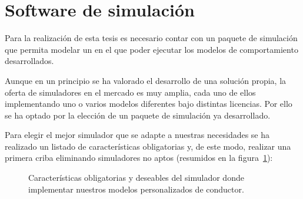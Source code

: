 \section{Software de simulación}

Para la realización de esta tesis es necesario contar con un paquete de simulación que permita modelar un  en el que poder ejecutar los modelos de comportamiento desarrollados.

Aunque en un principio se ha valorado el desarrollo de una solución propia, la oferta de simuladores en el mercado es muy amplia, cada uno de ellos implementando uno o varios modelos diferentes bajo distintas licencias. Por ello se ha optado por la elección de un paquete de simulación ya desarrollado.


Para elegir el mejor simulador que se adapte a nuestras necesidades se ha realizado un listado de características obligatorias y, de este modo, realizar una primera criba eliminando simuladores no aptos (resumidos en la figura~\ref{fig:simulator-features}):

\begin{figure}[t]
	\centering
	\caption[Características obligatorias y deseables del simulador a elegir]{Características obligatorias y deseables del simulador donde implementar nuestros modelos personalizados de conductor.}
	\label{fig:simulator-features}
\end{figure}

